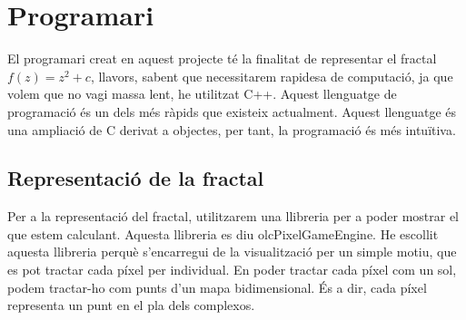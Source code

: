 \section{Programari}
El programari creat en aquest projecte té la finalitat de representar el fractal $f(z) = z^2 + c$, llavors, sabent que necessitarem rapidesa de computació, ja que volem que no vagi massa lent, he utilitzat C++. Aquest llenguatge de programació és un dels més ràpids que existeix actualment. Aquest llenguatge és una ampliació de C derivat a objectes, per tant, la programació és més intuïtiva.

\subsection{Representació de la fractal}
Per a la representació del fractal, utilitzarem una llibreria per a poder mostrar el que estem calculant. Aquesta llibreria es diu olcPixelGameEngine. He escollit aquesta llibreria perquè s'encarregui de la visualització per un simple motiu, que es pot tractar cada píxel per individual. \n
En poder tractar cada píxel com un sol, podem tractar-ho com punts d'un mapa bidimensional. És a dir, cada píxel representa un punt en el pla dels complexos.
